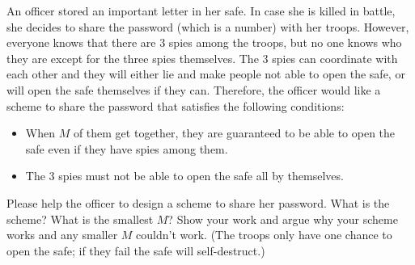 

An officer stored an important letter in her safe. In case she is
killed in battle, she decides to share the password (which is a number)
with her troops. However, everyone knows that there are 3 spies among
the troops, but no one knows who they are except for the three spies
themselves. The 3 spies can coordinate with each other and they will
either lie and make people not able to open the safe, or will open the
safe themselves if they can. Therefore, the officer would like a
scheme to share the password that satisfies the following conditions:
\begin{itemize}
	\item When $M$ of them get together, they are guaranteed to be
          able to open the safe even if they have spies among them.
	\item The 3 spies must not be able to open the safe all by themselves.
\end{itemize}

Please help the officer to design a scheme to share her password. What
is the scheme? What is the smallest $M$? Show your work and argue why
your scheme works and any smaller $M$ couldn't work. (The troops only 
have one chance to open the safe; if they fail the safe will 
self-destruct.)



